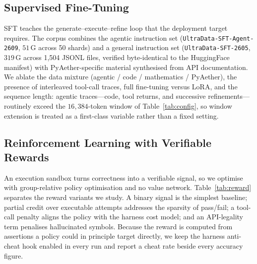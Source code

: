 \subsection{Supervised Fine-Tuning}\label{sec:posttrain-sft}
SFT teaches the generate--execute--refine loop that the deployment target requires.
The corpus combines the agentic instruction set (\texttt{UltraData-SFT-Agent-2609}, $51$\,G across 50 shards) and a general instruction set (\texttt{UltraData-SFT-2605}, $319$\,G across 1{,}504 JSONL files, verified byte-identical to the HuggingFace manifest) with PyAether-specific material synthesised from API documentation.
We ablate the data mixture (agentic / code / mathematics / PyAether), the presence of interleaved tool-call traces, full fine-tuning versus LoRA, and the sequence length: agentic traces---code, tool returns, and successive refinements---routinely exceed the $16{,}384$-token window of Table~\ref{tab:config}, so window extension is treated as a first-class variable rather than a fixed setting.

\subsection{Reinforcement Learning with Verifiable Rewards}\label{sec:posttrain-rl}
An execution sandbox turns correctness into a verifiable signal, so we optimise with group-relative policy optimisation and no value network.
Table~\ref{tab:reward} separates the reward variants we study.
A binary signal is the simplest baseline; partial credit over executable attempts addresses the sparsity of pass/fail; a tool-call penalty aligns the policy with the harness cost model; and an API-legality term penalises hallucinated symbols.
Because the reward is computed from assertions a policy could in principle target directly, we keep the harness anti-cheat hook enabled in every run and report a cheat rate beside every accuracy figure.

